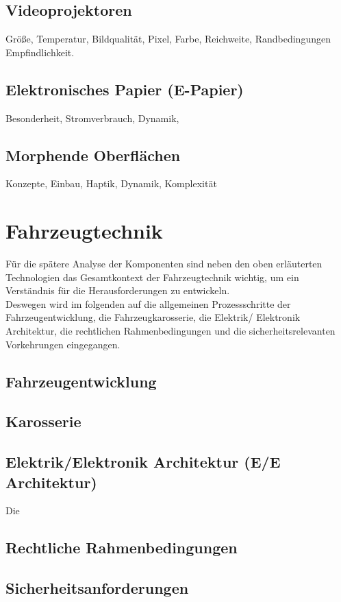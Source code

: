 \subsection{Videoprojektoren}
Größe, Temperatur, Bildqualität, Pixel, Farbe, Reichweite, Randbedingungen Empfindlichkeit.
\subsection{Elektronisches Papier (E-Papier)}
Besonderheit, Stromverbrauch, Dynamik,
\subsection{Morphende Oberflächen}
Konzepte, Einbau, Haptik, Dynamik, Komplexität

\section{Fahrzeugtechnik}
Für die spätere Analyse der Komponenten sind neben den oben erläuterten Technologien das Gesamtkontext der Fahrzeugtechnik wichtig, um ein Verständnis für die Herausforderungen zu entwickeln.\\
Deswegen wird im folgenden auf die allgemeinen Prozessschritte der Fahrzeugentwicklung, die Fahrzeugkarosserie, die Elektrik/ Elektronik Architektur, die rechtlichen Rahmenbedingungen und die sicherheitsrelevanten Vorkehrungen eingegangen.
\subsection{Fahrzeugentwicklung}
\subsection{Karosserie}
\subsection{Elektrik/Elektronik Architektur (E/E Architektur)}
Die


\subsection{Rechtliche Rahmenbedingungen}

\subsection{Sicherheitsanforderungen}